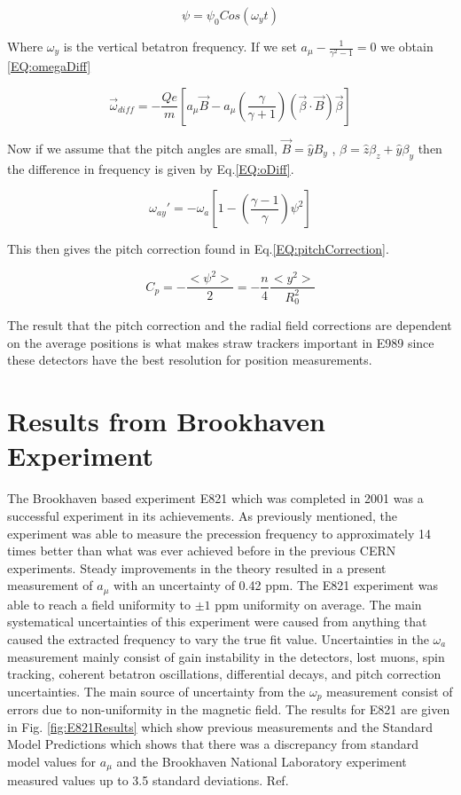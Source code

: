 \documentclass[./Thesis]{subfiles}
\begin{document}
\begin{equation}
\label{EQ:betatron}
\psi = \psi_0 Cos(\omega_y t)
\end{equation}

Where $\omega_y$ is the vertical betatron frequency. If we set $a_\mu - \frac{1}{\gamma^2-1}=0$ we obtain \ref{EQ:omegaDiff}

\begin{equation}
\label{EQ:omegaDiff}
\vec{\omega}_{diff} = - \frac{Qe}{m}[a_\mu \vec{B} - a_\mu(\frac{\gamma}{\gamma+1})(\vec{\beta}\cdot\vec{B})\vec{\beta}]
\end{equation}

Now if we assume that the pitch angles are small, $\vec{B} = \hat{y} B_y$ , $\beta=\hat{z}\beta_z + \hat{y}\beta_y$ then the difference in frequency is given by Eq.\ref{EQ:oDiff}.

\begin{equation}
\label{EQ:oDiff}
\omega_{ay}' = -\omega_a[1-(\frac{\gamma -1 }{\gamma})\psi^2]
\end{equation}


This then gives the pitch correction found in Eq.\ref{EQ:pitchCorrection}.

\begin{equation}
\label{EQ:pitchCorrection}
C_p = - \frac{<\psi^2>}{2} = - \frac{n}{4}\frac{<y^2>}{R_0^2}
\end{equation}

The result that the pitch correction and the radial field corrections are dependent on the average positions is what makes straw trackers important in E989 since these detectors have the best resolution for position measurements. 

\section{Results from Brookhaven Experiment}
	The Brookhaven based experiment E821 which was completed in 2001 was a successful experiment in its achievements.  As previously mentioned, the experiment was able to measure the precession frequency to approximately 14 times better than what was ever achieved before in the previous CERN experiments. Steady improvements in the theory resulted in a present measurement of $a_\mu$ with an uncertainty of 0.42 ppm.  The E821 experiment was able to reach a field uniformity to $\pm1$ ppm uniformity on average.  The main systematical uncertainties of this experiment were caused from anything that caused the extracted frequency to vary the true fit value.  Uncertainties in the $\omega_a$ measurement mainly consist of gain instability in the detectors, lost muons, spin tracking, coherent betatron oscillations, differential decays, and pitch correction uncertainties.  The main source of uncertainty from the $\omega_p$ measurement consist of errors due to non-uniformity in the magnetic field.  The results for E821 are given in Fig. \ref{fig:E821Results} which show previous measurements and the Standard Model Predictions which shows that there was a discrepancy from standard model values for $a_\mu$ and the Brookhaven National Laboratory experiment measured values up to 3.5 standard deviations. Ref.\cite{TDR}
	
\end{document}
